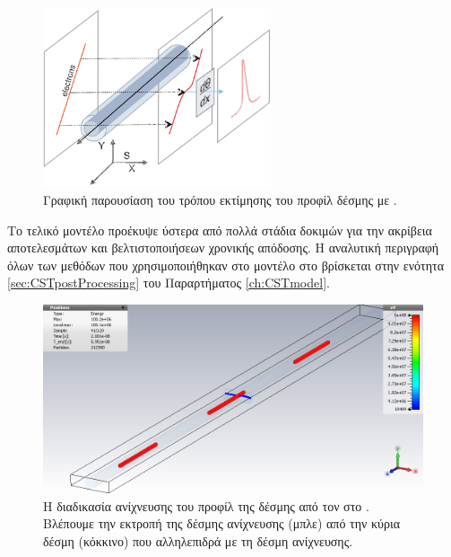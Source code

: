 \begin{figure}[tph]
\includegraphics[width=0.6\textwidth]{figures/EBS-profile-calculation}
\centering
\caption{Γραφική παρουσίαση του τρόπου εκτίμησης του προφίλ δέσμης με  \cite{Blokland2009}.}
\label{fig:EBS-profile-calculation}
\end{figure}

Το τελικό μοντέλο προέκυψε ύστερα από πολλά στάδια δοκιμών για την ακρίβεια αποτελεσμάτων και βελτιστοποιήσεων χρονικής απόδοσης.
Η αναλυτική περιγραφή όλων των μεθόδων  που χρησιμοποιήθηκαν στο μοντέλο στο  βρίσκεται στην ενότητα \ref{sec:CSTpostProcessing} του Παραρτήματος \ref{ch:CSTmodel}.

\begin{figure}[tbh]
\includegraphics[width=\textwidth]{figures/CST-EBS-implementation/CST-multi-bunch-EBS-detection}
\centering
\caption[Η διαδικασία ανίχνευσης του προφίλ της δέσμης από τον  στο .]
{Η διαδικασία ανίχνευσης του προφίλ της δέσμης από τον  στο .
Βλέπουμε την εκτροπή της δέσμης ανίχνευσης (μπλε) από την κύρια δέσμη (κόκκινο) που αλληλεπιδρά με τη δέσμη ανίχνευσης.}
\label{fig:CST-MultiBunchEBSDetection}
\end{figure}

